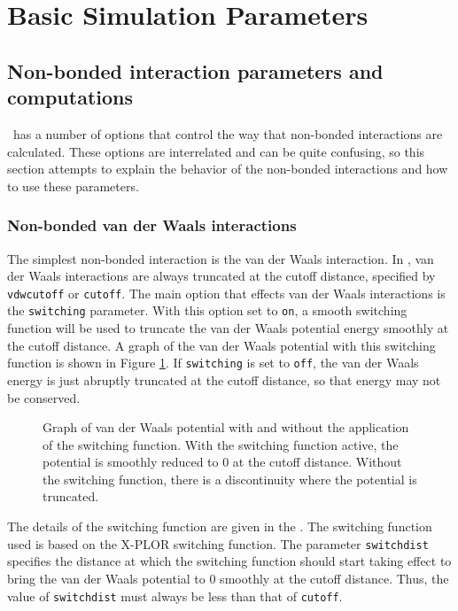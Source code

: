 \section{Basic Simulation Parameters}
\label{section:basic}


\subsection{Non-bonded interaction parameters and computations}
\label{section:electdesc}

\NAMD\ has a number of options that control the way that non-bonded
interactions are calculated.  These options are interrelated and
can be quite confusing, so this section attempts to explain the
behavior of the non-bonded interactions and how to use these
parameters.

\subsubsection{Non-bonded van der Waals interactions}
The simplest non-bonded 
interaction is the van der Waals interaction.  In 
\NAMD, van der Waals interactions are always truncated at the 
cutoff distance, specified by \verb!vdwcutoff! or \verb!cutoff!.  
The main option that effects van der Waals interactions
is the \verb!switching! parameter.  With this option set to \verb!on!,
a smooth switching function will be used to truncate the
van der Waals potential energy smoothly at the cutoff distance.  
A graph of the van der Waals 
potential with this switching function is shown in Figure 
\ref{fig:switching}.  If \verb!switching! is set to \verb!off!, the 
van der Waals energy is just abruptly truncated at the cutoff 
distance, so that energy may not be conserved.  

\begin{figure}[htb]
  \caption[Graph of van der Waals potential with and without switching]
  {\small Graph of van der Waals potential with and without the
  application of the switching function.  With the switching function
  active, the potential is smoothly reduced to 0 at the cutoff distance.
  Without the switching function, there is a discontinuity where the
  potential is truncated.}
  \label{fig:switching}
\end{figure}

The details of the switching function are given in the \PG.
The switching function used is based on the X-PLOR switching
function.  The parameter \verb!switchdist! specifies the distance
at which the switching function should start taking effect to
bring the van der Waals potential to 0 smoothly at the cutoff distance.  
Thus, the value of \verb!switchdist! must always be less than that 
of \verb!cutoff!.


